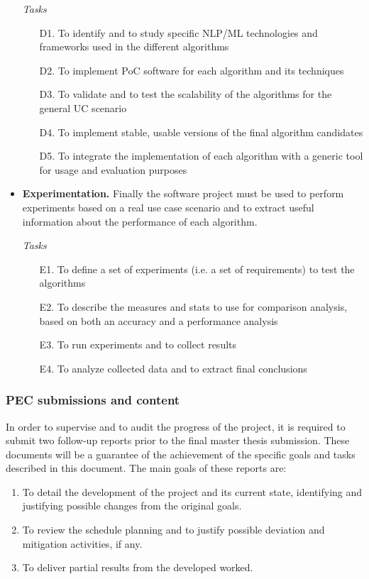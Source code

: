 \documentclass[11pt]{article}
\begin{document}
\begin{itemize}
\textit{Tasks}
\begin{enumerate}
\item[D1.] To identify and to study specific NLP/ML technologies and frameworks used in the different algorithms
\item[D2.] To implement PoC software for each algorithm and its techniques
\item[D3.] To validate and to test the scalability of the algorithms for the general UC scenario
\item[D4.] To implement stable, usable versions of the final algorithm candidates
\item[D5.] To integrate the implementation of each algorithm with a generic tool for usage and evaluation purposes
\end{enumerate}
\item \textbf{Experimentation.} Finally the software project must be used to perform experiments based on a real use case scenario and to extract useful information about the performance of each algorithm.

\textit{Tasks}
\begin{enumerate}
\item[E1.] To define a set of experiments (i.e. a set of requirements) to test the algorithms
\item[E2.] To describe the measures and stats to use for comparison analysis, based on both an accuracy and a performance analysis
\item[E3.] To run experiments and to collect results
\item[E4.] To analyze collected data and to extract final conclusions
\end{enumerate}
\end{itemize}

\subsubsection{PEC submissions and content}

In order to supervise and to audit the progress of the project, it is required to submit two follow-up reports prior to the final master thesis submission. These documents will be a guarantee of the achievement of the specific goals and tasks described in this document. The main goals of these reports are:

\begin{enumerate}
\item To detail the development of the project and its current state, identifying and justifying possible changes from the original goals.
\item To review the schedule planning and to justify possible deviation and mitigation activities, if any.
\item To deliver partial results from the developed worked.
\end{enumerate}
\end{document}
